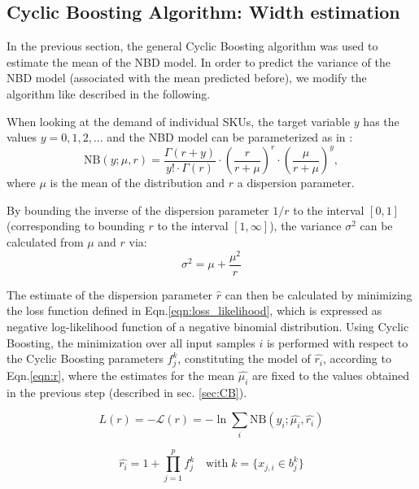 \documentclass[BCOR=1mm, DIV=calc,10pt,
twoside=true,
twocolumn,
headings=normal]{scrartcl}
\newcommand{\eqn}{Eqn.}
\begin{document}
\subsection{Cyclic Boosting Algorithm: Width estimation}
\label{sec:cb_width}

In the previous section, the general Cyclic Boosting algorithm was used to estimate the mean of the NBD model. In order to predict the variance of the NBD model (associated with the mean predicted before), we modify the algorithm like described in the following.

When looking at the demand of individual SKUs, the target variable $y$ has the values $y = 0, 1, 2, ...$ and the NBD model can be parameterized as in \cite{hilbe2011negative}:
\begin{equation} \label{eqn:nbinom}
\mathrm{NB}(y; \mu, r) = \frac{\Gamma(r + y)}{y! \cdot \Gamma(r)} \cdot \left(\frac{r}{r + \mu}\right)^r \cdot \left(\frac{\mu}{r + \mu}\right)^y,
\end{equation}
where $\mu$ is the mean of the distribution and $r$ a dispersion parameter.

By bounding the inverse of the dispersion parameter $1/r$ to the interval $[0, 1]$ (corresponding to bounding $r$ to the interval $[1, \infty]$), the variance $\sigma^2$ can be calculated from $\mu$ and $r$ via:
\begin{equation} \label{eqn:variance_r}
\sigma^2 = \mu + \frac{\mu^2}{r}
\end{equation}

The estimate of the dispersion parameter $\hat{r}$ can then be calculated by minimizing the loss function defined in \eqn \eqref{eqn:loss_likelihood}, which is expressed as negative log-likelihood function of a negative binomial distribution. Using Cyclic Boosting, the minimization over all input samples $i$ is performed with respect to the Cyclic Boosting parameters $f^k_j$, constituting the model of $\hat{r_i}$, according to \eqn \eqref{eqn:r}, where the estimates for the mean $\hat{\mu_i}$ are fixed to the values obtained in the previous step (described in sec. \ref{sec:CB}).

\begin{equation} \label{eqn:loss_likelihood}
L(r) = -\mathcal{L}(r) = -\ln \sum_i \mathrm{NB}(y_i; \hat{\mu_i}, \hat{r_i})
\end{equation}

\begin{equation} \label{eqn:r}
\hat{r_i} = 1 + \prod \limits_{j=1}^p f^k_j \quad \text{with}\; k=\{ x_{j,i} \in b^k_j\}
\end{equation}
\end{document}
